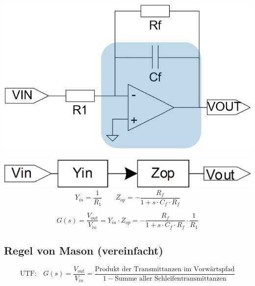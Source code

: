 \begin{minipage}[c]{0.4\columnwidth}
    \includegraphics[width=\columnwidth]{images/filter_signalflussdiagramme_tiefpass_ordnung_1.png}
\end{minipage}
\hfill
\begin{minipage}[c]{0.48\columnwidth}
    \includegraphics[width=\columnwidth]{images/filter_signalflussdiagramme_tiefpass_ordnung_1_sfd.png}
    $$ Y_{in} = \frac{1}{R_1} \qquad Z_{op} = - \frac{R_f}{1 + s \cdot C_f \cdot R_f} $$
\end{minipage}

$$ G(s)= \frac{V_{out}}{V_{in}} = Y_{in} \cdot Z_{op} =- \frac{R_f}{1 + s \cdot C_f \cdot R_f} \cdot \frac{1}{R_1} $$



\subsection{Regel von Mason (vereinfacht)}

$$ \text{UTF:} \quad G(s) = \frac{V_{out}}{V_{in}} = \frac{\text{Produkt der Transmittanzen im Vorwärtspfad}}{1 - \text{Summe aller Schleifentransmittanzen}} $$



